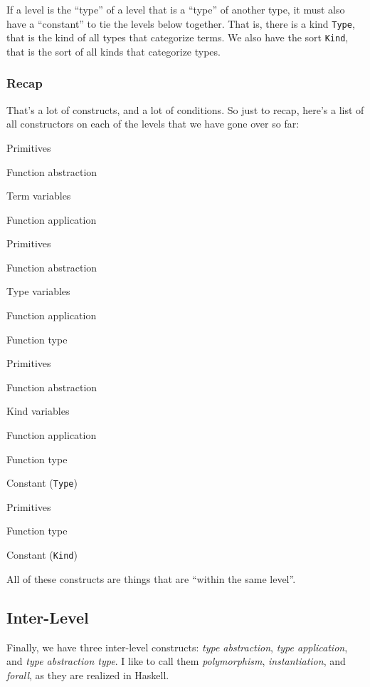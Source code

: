 \documentclass[]{article}
\begin{document}
If a level is the ``type'' of a level that is a ``type'' of another type, it
must also have a ``constant'' to tie the levels below together. That is, there
is a kind \texttt{Type}, that is the kind of all types that categorize terms. We
also have the sort \texttt{Kind}, that is the sort of all kinds that categorize
types.

\subsubsection{Recap}\label{recap}

That's a lot of constructs, and a lot of conditions. So just to recap, here's a
list of all constructors on each of the levels that we have gone over so far:

\begin{description}
\tightlist
\item[Term]
Primitives

Function abstraction

Term variables

Function application
\item[Type]
Primitives

Function abstraction

Type variables

Function application

Function type
\item[Kind]
Primitives

Function abstraction

Kind variables

Function application

Function type

Constant (\texttt{Type})
\item[Sort]
Primitives

Function type

Constant (\texttt{Kind})
\end{description}

All of these constructs are things that are ``within the same level''.

\subsection{Inter-Level}\label{inter-level}

Finally, we have three inter-level constructs: \emph{type abstraction},
\emph{type application}, and \emph{type abstraction type}. I like to call them
\emph{polymorphism}, \emph{instantiation}, and \emph{forall}, as they are
realized in Haskell.
\end{document}
